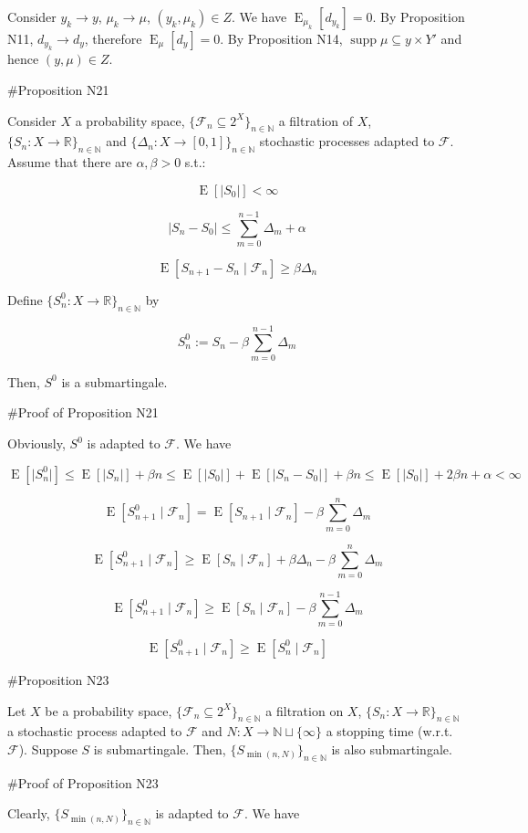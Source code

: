\documentclass[a4paper]{article}
\DeclareMathOperator{\Supp}{supp}
\DeclareMathOperator{\E}{E}
\newcommand{\Nats}{\mathbb{N}}
\newcommand{\Reals}{\mathbb{R}}
\newcommand{\Sq}[2]{\{#1\}_{#2 \in \Nats}}
\newcommand{\Sqn}[1]{\Sq{#1}{n}}
\newcommand{\Abs}[1]{\lvert #1 \rvert}
\newcommand{\F}{\mathcal{F}}
\begin{document}
Consider ${y_k \rightarrow y}$, ${\mu_k \rightarrow \mu}$, ${(y_k, \mu_k) \in Z}$. We have ${\E_{\mu_k}[d_{y_k}]=0}$. By Proposition N11, ${d_{y_k} \rightarrow d_y}$, therefore ${\E_\mu[d_y] = 0}$. By Proposition N14, ${\Supp \mu \subseteq y \times Y'}$ and hence ${(y,\mu) \in Z}$.

\#Proposition N21

Consider ${X}$ a probability space, ${\{\F_n \subseteq 2^X\}_{n \in \Nats}}$ a filtration of ${X}$, ${\{S_n:X \rightarrow \Reals\}_{n \in \Nats}}$ and ${\{\Delta_n:X \rightarrow [0,1]\}_{n \in \Nats}}$ stochastic processes adapted to ${\F}$. Assume that there are ${\alpha,\beta > 0}$ s.t.:

$$\E[\Abs{S_0}] < \infty$$

$$\Abs{S_{n}-S_0} \leq \sum_{m=0}^{n-1} \Delta_m + \alpha$$

$$\E[S_{n+1} - S_n \mid \F_n] \geq \beta \Delta_n$$

Define ${\Sqn{S^0_n: X \rightarrow \Reals}}$ by

$$S^0_n := S_n - \beta \sum_{m=0}^{n-1} \Delta_m$$
 
Then, ${S^0}$ is a submartingale.

\#Proof of Proposition N21

Obviously, ${S^0}$ is adapted to ${\F}$. We have

$$\E[\Abs{S^0_{n}}] \leq \E[\Abs{S_n}] + \beta n \leq \E[\Abs{S_0}] + \E[\Abs{S_n - S_0}] + \beta n \leq \E[\Abs{S_0}] + 2\beta n + \alpha < \infty$$

$$\E[S^0_{n+1} \mid \F_n] = \E[S_{n+1} \mid \F_n] - \beta \sum_{m = 0}^{n} \Delta_m$$

$$\E[S^0_{n+1} \mid \F_n] \geq \E[S_{n} \mid \F_n] + \beta \Delta_n - \beta \sum_{m = 0}^{n} \Delta_m$$

$$\E[S^0_{n+1} \mid \F_n] \geq \E[S_{n} \mid \F_n] - \beta \sum_{m = 0}^{n - 1} \Delta_m$$

$$\E[S^0_{n+1} \mid \F_n] \geq \E[S^0_{n} \mid \F_n]$$

\#Proposition N23

Let ${X}$ be a probability space, ${\Sqn{\F_n \subseteq 2^X}}$ a filtration on ${X}$, ${\Sqn{S_n: X \rightarrow \Reals}}$ a stochastic process adapted to ${\F}$ and ${N: X \rightarrow \Nats \sqcup \{\infty\}}$ a stopping time (w.r.t. ${\F}$). Suppose ${S}$ is submartingale. Then, ${\Sqn{S_{\min(n,N)}}}$ is also submartingale.

\#Proof of Proposition N23

Clearly, ${\Sqn{S_{\min(n,N)}}}$ is adapted to ${\F}$. We have
\end{document}
